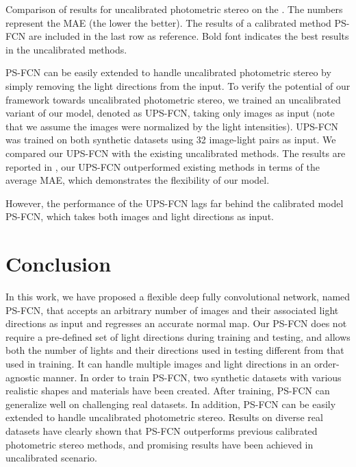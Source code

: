 \begin{table}[htbp]
    \caption[Results for uncalibrated photometric stereo on the \diligent]{Comparison of results for uncalibrated photometric stereo on the \diligent. The numbers represent the MAE (the lower the better). The results of a calibrated method PS-FCN are included in the last row as reference. Bold font indicates the best results in the uncalibrated methods.} \label{tab:uncalib}
    
\end{table}

PS-FCN can be easily extended to handle uncalibrated photometric stereo by simply removing the light directions from the input. To verify the potential of our framework towards uncalibrated photometric stereo, we trained an uncalibrated variant of our model, denoted as UPS-FCN, taking only images as input (note that we assume the images were normalized by the light intensities). UPS-FCN was trained on both synthetic datasets using 32 image-light pairs as input. We compared our UPS-FCN with the existing uncalibrated methods. The results are reported in , our UPS-FCN outperformed existing methods in terms of the average MAE, which demonstrates the flexibility of our model.

However, the performance of the UPS-FCN lags far behind the calibrated model PS-FCN, which takes both images and light directions as input.

\section{Conclusion}
In this work, we have proposed a flexible deep fully convolutional network, named PS-FCN, that accepts an arbitrary number of images and their associated light directions as input and regresses an accurate normal map. Our PS-FCN does not require a pre-defined set of light directions during training and testing, and allows both the number of lights and their directions used in testing different from that used in training. It can handle multiple images and light directions in an order-agnostic manner. In order to train PS-FCN, two synthetic datasets with various realistic shapes and materials have been created. After training, PS-FCN can generalize well on challenging real datasets. 
In addition, PS-FCN can be easily extended to handle uncalibrated photometric stereo. 
Results on diverse real datasets have clearly shown that PS-FCN outperforms previous calibrated photometric stereo methods, and promising results have been achieved in uncalibrated scenario. 

